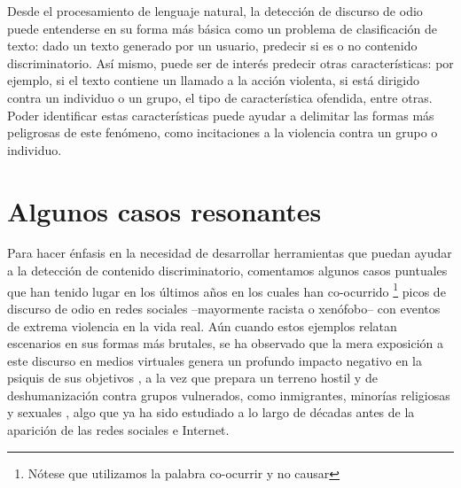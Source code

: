 Desde el procesamiento de lenguaje natural, la detección de discurso de odio puede entenderse en su forma más básica como un problema de clasificación de texto: dado un texto generado por un usuario, predecir si es o no contenido discriminatorio. Así mismo, puede ser de interés predecir otras características: por ejemplo, si el texto contiene un llamado a la acción violenta, si está dirigido contra un individuo o un grupo, el tipo de característica ofendida, entre otras. Poder identificar estas características puede ayudar a delimitar las formas más peligrosas de este fenómeno, como incitaciones a la violencia contra un grupo o individuo.




\section{Algunos casos resonantes}

Para hacer énfasis en la necesidad de desarrollar herramientas que puedan ayudar a la detección de contenido discriminatorio, comentamos algunos casos puntuales que han tenido lugar en los últimos años en los cuales han co-ocurrido \footnote{Nótese que utilizamos la palabra co-ocurrir y no causar} picos de discurso de odio en redes sociales --mayormente racista o xenófobo-- con eventos de extrema violencia en la vida real. Aún cuando estos ejemplos relatan escenarios en sus formas más brutales, se ha observado que la mera exposición a este discurso en medios virtuales genera un profundo impacto negativo en la psiquis de sus objetivos \cite{saha2019prevalence}, a la vez que prepara un terreno hostil y de deshumanización contra grupos vulnerados, como inmigrantes, minorías religiosas y sexuales \cite{bilewicz2020hate}, algo que ya ha sido estudiado a lo largo de décadas antes de la aparición de las redes sociales e Internet.


